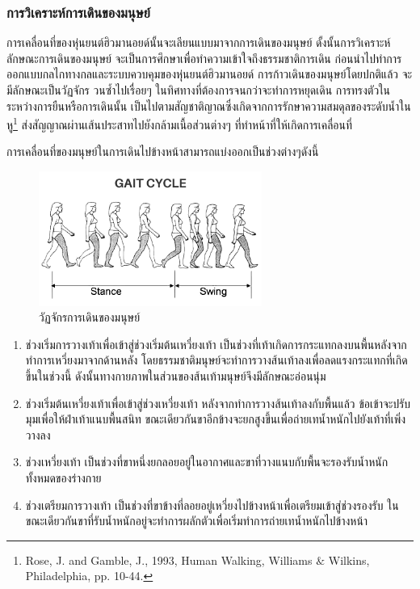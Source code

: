 \subsubsection{การวิเคราะห์การเดินของมนุษย์}
การเคลื่อนที่ของหุ่นยนต์ฮิวมานอยด์นั้นจะเลียนแบบมาจากการเดินของมนุษย์
ดั้งนั้นการวิเคราะห์ลักษณะการเดินของมนุษย์ จะเป็นการศึกษาเพื่อทำความเข้าใจถึงธรรมชาติการเดิน
ก่อนนำไปทำการออกแบบกลไกทางกลและระบบควบคุมของหุ่นยนต์ฮิวมานอยด์
การก้าวเดินของมนุษย์โดยปกติแล้ว จะมีลักษณะเป็นวัฏจักร วนซ้ำไปเรื่อยๆ ในทิศทางที่ต้องการจนกว่าจะทำการหยุดเดิน
การทรงตัวในระหว่างการยืนหรือการเดินนั้น เป็นไปตามสัญชาติญาณซึ่งเกิดจากการรักษาความสมดุลของระดับน้ำในหู\footnote{ Rose, J. and Gamble, J., 1993, Human Walking, Williams $\&$  Wilkins, Philadelphia, pp. 10-44. }
ส่งสัญญาณผ่านเส้นประสาทไปยังกล้ามเนื้อส่วนต่างๆ ที่ทำหน้าที่ให้เกิดการเคลื่อนที่

การเคลื่อนที่ของมนุษย์ในการเดินไปข้างหน้าสามารถแบ่งออกเป็นช่วงต่างๆดังนี้
\begin{figure}[!ht]
	\centering
	\includegraphics[width=0.65\textwidth]{chapter2/images/gaitcycle.png}
	\caption{วัฏจักรการเดินของมนุษย์}
	\label{fig:human_gait_cycle}
\end{figure}
\begin{enumerate}[label=\arabic*., leftmargin=1.5cm]
	\item ช่วงเริ่มการวางเท้าเพื่อเข้าสู่ช่วงเริ่มต้นเหวี่ยงเท้า เป็นช่วงที่เท้าเกิดการกระแทกลงบนพื้นหลังจากทำการเหวี่ยงมาจากด้านหลัง
	      โดยธรรมชาติมนุษย์จะทำการวางส้นเท้าลงเพื่อลดแรงกระแทกที่เกิดขึ้นในช่วงนี้
	      ดังนั้นทางกายภาพในส่วนของส้นเท้ามนุษย์จึงมีลักษณะอ่อนนุ่ม
	\item ช่วงเริ่มต้นเหวี่ยงเท้าเพื่อเข้าสู่ช่วงเหวี่ยงเท้า หลังจากทำการวางส้นเท้าลงกับพื้นแล้ว ข้อเข้าจะปรับมุมเพื่อให้ฝ่าเท้าแนบพื้นสนิท
	      ขณะเดียวกันขาอีกข้างจะยกสูงขึ้นเพื่อถ่ายเทน้ำหนักไปยังเท้าที่เพิ่งวางลง
	\item ช่วงเหวี่ยงเท้า เป็นช่วงที่ขาหนึ่งยกลอยอยู่ในอากาศและขาที่วางแนบกับพื้นจะรองรับน้ำหนักทั้งหมดของร่างกาย
	\item ช่วงเตรียมการวางเท้า เป็นช่วงที่ขาข้างที่ลอยอยู่เหวี่ยงไปข้างหน้าเพื่อเตรียมเข้าสู่ช่วงรองรับ 
	      ในขณะเดียวกันขาที่รับน้ำหนักอยู่จะทำการผลักตัวเพื่อเริ่มทำการถ่ายเทน้ำหนักไปข้างหน้า
\end{enumerate}

